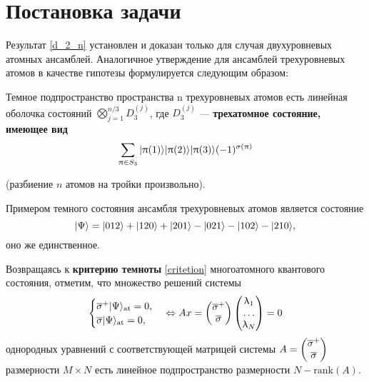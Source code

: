 \section{Постановка задачи}\label{sec:ch4/sect2}
Результат \eqref{d_2_n} установлен и доказан только для случая двухуровневых атомных ансамблей. Аналогичное утверждение для ансамблей трехуровневых
атомов в качестве гипотезы формулируется следующим образом:
\begin{hyp}
	\label{Th:20}Темное подпространство пространства n трехуровневых атомов есть линейная оболочка состояний $\displaystyle \bigotimes_{j=1}^{n/3}{D_{3}^{(j)}}$,
	где $D_{3}^{(j)}$ --- \textbf{трехатомное состояние, имеющее вид}
	\begin{equation}
		\sum_{\uppi \in S_{3}}|\uppi(1)\rangle|\uppi(2)\rangle|\uppi(3)\rangle(-1)^{\sigma(\uppi)}
	\end{equation}
	\begin{center}(разбиение $n$ атомов на тройки произвольно).\end{center}
\end{hyp}

\indent Примером темного состояния ансамбля трехуровневых атомов является состояние
\begin{equation}
|\Psi\rangle = |012\rangle + |120\rangle + |201\rangle - |021\rangle - |102\rangle - |210\rangle,
\end{equation}
оно же единственное.

Возвращаясь к \textbf{критерию темноты} \eqref{critetion} многоатомного квантового состояния, отметим, что множество решений системы
\begin{equation}\label{slae}
	\begin{cases}
		\overline{\sigma}^{+}|\Psi\rangle_{\text{at}} = 0,\\
		\overline{\sigma}|\Psi\rangle_{\text{at}} = 0,
	\end{cases} \Leftrightarrow
	Ax =
	\begin{pmatrix}
		\overline{\sigma}^{+}\\
		\overline{\sigma}
	\end{pmatrix}
	\begin{pmatrix}
		\uplambda_1\\
		\dots\\
		\uplambda_N\\
	\end{pmatrix} = 0
\end{equation}
однородных уравнений с соответствующей матрицей системы
$
A=\begin{pmatrix}
	\overline{\sigma}^{+}\\
	\overline{\sigma}
\end{pmatrix}
$ размерности $M \times N$ есть линейное подпространство размерности $N - \mathrm{rank}(A)$.

